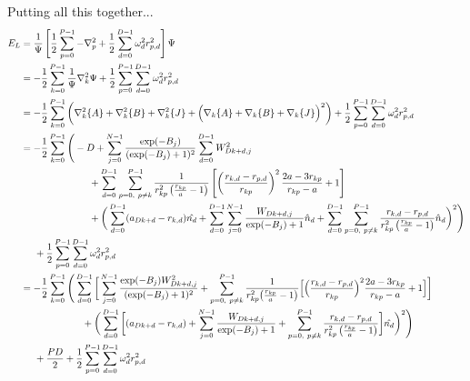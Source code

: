 \documentclass[12pt]{article}
\begin{document}
Putting all this together...
\begin{align*}
E_L &= \frac{1}{\Psi} \left[ \frac{1}{2} \sum_{p=0}^{P-1} -\nabla_p^2 + \frac{1}{2}\sum_{d=0}^{D-1} \omega_d^2r_{p,d}^2 \right] \Psi \\
&= -\frac{1}{2} \sum_{k=0}^{P-1} \frac{1}{\Psi} \nabla_k^2 \Psi + \frac{1}{2} \sum_{p=0}^{P-1} \sum_{d=0}^{D-1} \omega_d^2r_{p,d}^2\\
&= -\frac{1}{2} \sum_{k=0}^{P-1} 
\bigg( \nabla_k^2 \{ A \}  + \nabla_k^2 \{ B \}  + \nabla_k^2 \{ J \} + \Big( \nabla_k \{ A \}  + \nabla_k \{ B \}  + \nabla_k \{ J \}\Big)^2 \bigg)
+ \frac{1}{2} \sum_{p=0}^{P-1} \sum_{d=0}^{D-1} \omega_d^2r_{p,d}^2\\
&= -\frac{1}{2} \sum_{k=0}^{P-1} 
\Bigg( -D  + \sum_{j=0}^{N-1} \frac{\exp(-B_j)}{(\exp(-B_j)+1)^2} \sum_{d=0}^{D-1} W_{Dk+d,j}^2  \\
& \hspace*{2.5 cm} 
+ \sum_{d=0}^{D-1} \sum_{p=0, \ p\neq k}^{P-1}  \frac{1}{r_{kp}^2 \left( \frac{r_{kp}}{a} -1 \right)}
\left[ 
\left( \frac{r_{k,d}-r_{p,d}}{r_{kp}} \right)^2 \frac{2a-3r_{kp}}{r_{kp}-a}
 +1
\right]\\
& \hspace*{2.5 cm}
 + \bigg( \sum_{d=0}^{D-1} (a_{Dk+d} -r_{k,d} ) \hat{n_{d}}  
 + \sum_{d=0}^{D-1} \sum_{j=0}^{N-1}  \frac{W_{Dk+d,j}}{\exp(-B_j)+1}   \hat{n}_d  
 + \sum_{d=0}^{D-1} \sum_{p=0, \ p\neq k}^{P-1} \frac{r_{k,d}-r_{p,d}}{r_{kp}^2 \left( \frac{r_{kp}}{a} -1 \right)} \hat{n}_d
 \bigg)^2 \Bigg)\\
& \hspace*{.5 cm} + \frac{1}{2} \sum_{p=0}^{P-1} \sum_{d=0}^{D-1} \omega_d^2r_{p,d}^2\\
&= -\frac{1}{2} \sum_{k=0}^{P-1} 
\Bigg( \sum_{d=0}^{D-1} \bigg[ \sum_{j=0}^{N-1} \frac{\exp(-B_j)W_{Dk+d,j}^2}{(\exp(-B_j)+1)^2}
+ \sum_{p=0, \ p\neq k}^{P-1}  \frac{1}{r_{kp}^2 \big( \frac{r_{kp}}{a} -1 \big)}
\Big[ 
\Big( \frac{r_{k,d}-r_{p,d}}{r_{kp}} \Big)^2 \frac{2a-3r_{kp}}{r_{kp}-a}
 +1
\Big]  \bigg] \\
& \hspace*{2.25 cm}
+ \bigg( \sum_{d=0}^{D-1} \bigg[
(a_{Dk+d} -r_{k,d} )
+\sum_{j=0}^{N-1}  \frac{W_{Dk+d,j}}{\exp(-B_j)+1}
+\sum_{p=0, \ p\neq k}^{P-1} \frac{r_{k,d}-r_{p,d}}{r_{kp}^2 \left( \frac{r_{kp}}{a} -1 \right)}
 \bigg] \hat{n_{d}}
 \bigg)^2 \Bigg)\\
& \hspace*{.5 cm} + \frac{PD}{2}+ \frac{1}{2}\sum_{p=0}^{P-1} \sum_{d=0}^{D-1} \omega_d^2r_{p,d}^2\\

\end{align*}
\end{document}
